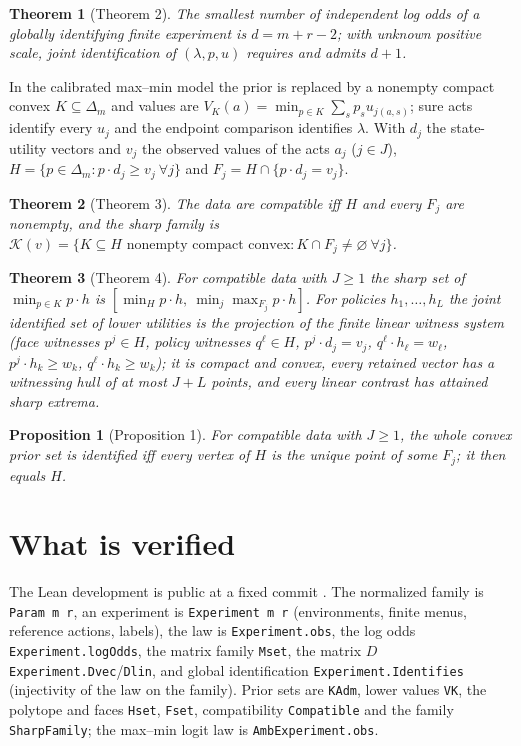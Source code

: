 \documentclass[11pt]{article}
\newtheorem{theorem}{Theorem}
\newtheorem{proposition}{Proposition}
\begin{document}
\begin{theorem}[Theorem 2]
The smallest number of independent log odds of a globally identifying finite experiment is $d=m+r-2$; with unknown positive scale, joint identification of $(\lambda,p,u)$ requires and admits $d+1$.
\end{theorem}

In the calibrated max--min model the prior is replaced by a nonempty compact convex $K\subseteq\Delta_m$ and values are $V_K(a)=\min_{p\in K}\sum_sp_su_{j(a,s)}$; sure acts identify every $u_j$ and the endpoint comparison identifies $\lambda$. With $d_j$ the state-utility vectors and $v_j$ the observed values of the acts $a_j$ ($j\in J$), $H=\{p\in\Delta_m:p\cdot d_j\ge v_j\ \forall j\}$ and $F_j=H\cap\{p\cdot d_j=v_j\}$.

\begin{theorem}[Theorem 3]
The data are compatible iff $H$ and every $F_j$ are nonempty, and the sharp family is $\mathcal K(v)=\{K\subseteq H\text{ nonempty compact convex}:K\cap F_j\neq\varnothing\ \forall j\}$.
\end{theorem}

\begin{theorem}[Theorem 4]
For compatible data with $J\ge1$ the sharp set of $\min_{p\in K}p\cdot h$ is $[\min_Hp\cdot h,\ \min_j\max_{F_j}p\cdot h]$. For policies $h_1,\dots,h_L$ the joint identified set of lower utilities is the projection of the finite linear witness system (face witnesses $p^j\in H$, policy witnesses $q^\ell\in H$, $p^j\cdot d_j=v_j$, $q^\ell\cdot h_\ell=w_\ell$, $p^j\cdot h_k\ge w_k$, $q^\ell\cdot h_k\ge w_k$); it is compact and convex, every retained vector has a witnessing hull of at most $J+L$ points, and every linear contrast has attained sharp extrema.
\end{theorem}

\begin{proposition}[Proposition 1]
For compatible data with $J\ge1$, the whole convex prior set is identified iff every vertex of $H$ is the unique point of some $F_j$; it then equals $H$.
\end{proposition}

\section{What is verified}

The Lean development is public at a fixed commit \cite{Lean}. The normalized family is \texttt{Param m r}, an experiment is \texttt{Experiment m r} (environments, finite menus, reference actions, labels), the law is \texttt{Experiment.obs}, the log odds \texttt{Experiment.logOdds}, the matrix family \texttt{Mset}, the matrix $D$ \texttt{Experiment.Dvec}/\texttt{Dlin}, and global identification \texttt{Experiment.Identifies} (injectivity of the law on the family). Prior sets are \texttt{KAdm}, lower values \texttt{VK}, the polytope and faces \texttt{Hset}, \texttt{Fset}, compatibility \texttt{Compatible} and the family \texttt{SharpFamily}; the max--min logit law is \texttt{AmbExperiment.obs}.
\end{document}
